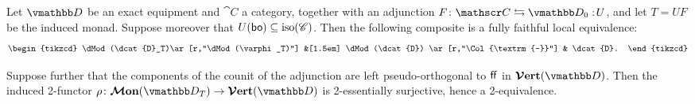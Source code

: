 \documentclass[11pt,oneside,article]{memoir}
\begin{document}
\begin{theorem}\label{thm:ffle_and_verts}
   Let $\dcat{D}$ be an exact equipment and $\cat{C}$ a category, together with an adjunction
   $F\colon\cat{C}\leftrightarrows\dcat{D}_0:\!U$, and let $T=UF$ be the induced monad. Suppose
   moreover that $U(\mathsf{bo})\subseteq\mathrm{iso}(\mathscr{C})$. Then the following composite is a fully faithful local equivalence:
   \begin{equation*}
      \begin{tikzcd}
         \dMod(\dcat{D}_T)\ar[r,"\dMod(\varphi_T)"] &[1.5em] \dMod(\dcat{D}) \ar[r,"\Col{\textrm{--}}"] & \dcat{D}.
      \end{tikzcd}
   \end{equation*}

   Suppose further that the components of the counit of the adjunction are left pseudo-orthogonal to
   $\mathsf{ff}$ in $\VVer(\dcat{D})$. Then the induced 2-functor
   $\rho\colon\MMon(\dcat{D}_T)\to\VVer(\dcat{D})$ is 2-essentially surjective, hence a
   2-equivalence.
\end{theorem}
\end{document}
